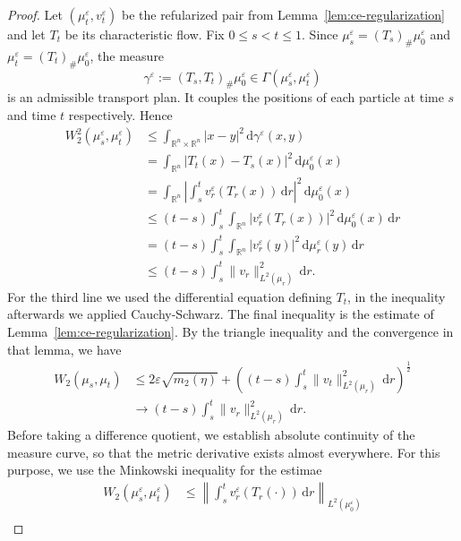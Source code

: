 \begin{proof}
	Let $(\mu_t^\varepsilon,v_t^\varepsilon)$ be the refularized pair from Lemma~\ref{lem:ce-regularization} and let $T_t$ be its characteristic flow.%
	Fix $0\leq s<t\leq 1$. Since $\mu_s^\varepsilon = (T_s)_\#\mu_0^\varepsilon$ and $\mu_t^\varepsilon=(T_t)_\#\mu_0^\varepsilon$, the measure
	$$
	\gamma^\varepsilon:=(T_s,T_t)_\#\mu_0^\varepsilon\in\Gamma(\mu_s^\varepsilon,\mu_t^\varepsilon)
	$$
	is an admissible transport plan. It couples the positions of each particle at time $s$ and time $t$ respectively. Hence
\begin{align*}
	W_2^2(\mu_s^\varepsilon,\mu_t^\varepsilon)&\leq\int_{\mathbb{R}^n\times \mathbb{R}^n}|x-y|^2\,\mathrm d\gamma^\varepsilon(x,y)\\
											  &=\int_{\mathbb{R}^n}|T_t(x)-T_s(x)|^2\,\mathrm d\mu_0^\varepsilon(x)\\
											  &=\int_{\mathbb{R}^n}\left|\int_s^t v_r^\varepsilon(T_r(x))\,\mathrm dr\right|^2\,\mathrm d\mu_0^\varepsilon(x)\\
											  &\leq(t-s)\int_s^t\int_{\mathbb{R}^n}|v_r^\varepsilon(T_r(x))|^2\,\mathrm d\mu_0^\varepsilon(x)\,\mathrm dr\\
											  &=(t-s)\int_s^t\int_{\mathbb{R}^n}|v_r^\varepsilon(y)|^2\,\mathrm d\mu_r^\varepsilon(y)\,\mathrm dr\\
											  &\leq(t-s)\int_s^t \lVert v_r\rVert_{L^2(\mu_r)}^2\,\mathrm dr.
\end{align*}
For the third line we used the differential equation defining $T_t$, in the inequality afterwards we applied Cauchy-Schwarz. The final inequality is the estimate of Lemma~\ref{lem:ce-regularization}. By the triangle inequality and the convergence in that lemma, we have
\begin{align*}
	W_2(\mu_s,\mu_t)&\leq2\varepsilon\sqrt{m_2(\eta)}+\left((t-s)\int_s^t \lVert v_t\rVert_{L^2(\mu_r)}^2\,\mathrm dr\right)^{\frac{1}{2}}\\
					&\longrightarrow (t-s)\int_s^t \lVert v_r\rVert_{L^2(\mu_r)}^2\,\mathrm dr.
\end{align*}
Before taking a difference quotient, we establish absolute continuity of the measure curve, so that the metric derivative exists almost everywhere. For this purpose, we use the Minkowski inequality for the estimae
\begin{align*}
	W_2(\mu_s^\varepsilon,\mu_t^\varepsilon) &\leq\left \lVert \int_s^t v_r^\varepsilon(T_r(\cdot))\,\mathrm dr\right\rVert_{L^2(\mu_0^\varepsilon)}\\

\end{align*}
\end{proof}

